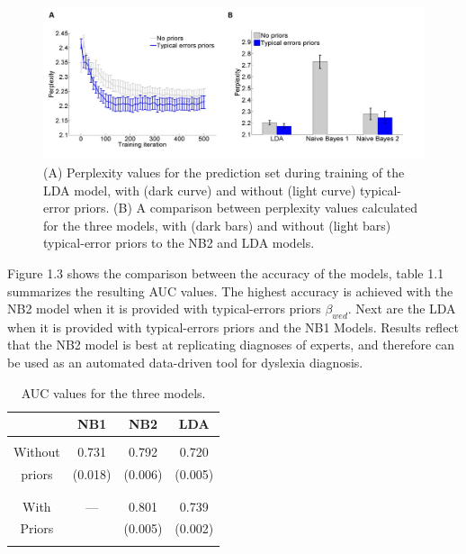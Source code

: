 {{\begin{figure}
\vspace{.3in}
\includegraphics[width=\textwidth]{Figures/Ch1/figure5AB_HOZ}
\caption{(A) Perplexity values for the prediction set during training of the LDA model, with (dark curve) and without (light curve) typical-error priors. (B) A comparison between perplexity values calculated for the three models, with (dark bars) and without (light bars) typical-error priors to the NB2 and LDA models.}
\vspace{.3in}
\end{figure}

 \vspace*{2\baselineskip}

Figure 1.3 shows the comparison between the accuracy of the models, table 1.1 summarizes the resulting AUC values. The highest accuracy is achieved with the NB2 model when it is provided with typical-errors priors $\beta_{wed}$. Next are the LDA when it is provided with typical-errors priors and the NB1 Models. Results reflect that the NB2 model is best at replicating diagnoses of experts, and therefore can be used as an automated data-driven tool for dyslexia diagnosis.

\begin{table}
\centering
\caption{AUC values for the three models.} 

\begin{tabular}{|c|c|c|c|} \hline
& NB1 & NB2 & LDA \\
\hline
&&&\\
Without & 0.731 & 0.792 & 0.720 \\
priors & (0.018) & (0.006) & (0.005) \\
&&&\\
\hline
&&&\\
With & --- & 0.801 & 0.739 \\
Priors &  & (0.005) & (0.002) \\
&&&\\
\hline\end{tabular}
\bigskip


\end{table}}}
